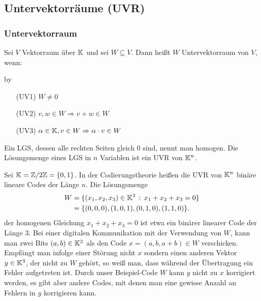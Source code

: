 \clearpage
\subsection{Untervektorräume (UVR)}
\subsubsection{Untervektorraum}

Sei $ V $ Vektorraum über $ \mathbb K $ und sei $ W \subseteq V $. Dann heißt $ W $ Untervektorraum von $ V $, wenn:

\advance\myindent by \the{}

\begin{itemize}[leftmargin=\myindent]
	\item[(UV1)]
		$ W \neq 0 $
	\item[(UV2)]
		$ v,w \in W \Rightarrow v+w \in W $
	\item[(UV3)]
		$ \alpha \in \mathbb K, v \in W \Rightarrow \alpha \cdot v \in W $
\end{itemize}

\begin{bem}
Ein LGS, dessen alle rechten Seiten gleich $0$ sind, nennt man homogen. Die Lösungsmenge eines LGS in $n$ Variablen ist ein UVR von $\mathbb K^n$. 
\end{bem}

\begin{bsp}
	Sei $\mathbb K = \mathbb Z/ 2 \mathbb Z = \{0,1\}$. In der Codierungstheorie heißen die UVR von $\mathbb K^n$ binäre lineare Codes der Länge $n$. Die Lösungsmenge 
	\begin{align*}
		W & = \{ (x_1,x_2,x_3) \in \mathbb K^3 \,:\, x_1 + x_2 + x_3 = 0 \}
		\\ & = \{ (0,0,0), (1,0,1), (0,1,0), (1,1,0) \}. 
	\end{align*}
	der homogenen Gleichung $x_1 + x_2 + x_3=0$ 
	ist etwa ein binärer linearer Code der Länge $3$. Bei einer digitalen Kommunikation mit der Verwendung von $W$, kann man zwei Bits $(a,b) \in \mathbb K^2$ als den Code $x=(a, b, a+b) \in W$ verschicken. Empfängt man infolge einer Störung nicht $x$ sondern einen anderen Vektor $y \in \mathbb K^3$, der nicht zu $W$ gehört, so weiß man, dass während der Übertragung ein Fehler aufgetreten ist. Durch unser Beispiel-Code $W$ kann $y$ nicht zu $x$ korrigiert werden, es gibt aber andere Codes, mit denen man eine gewisse Anzahl an Fehlern in $y$ korrigieren kann. 
\end{bsp} 


